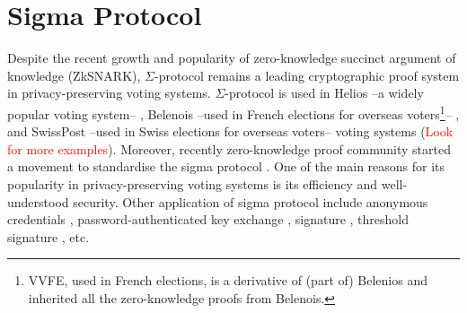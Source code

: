 \documentclass[conference,compsoc]{IEEEtran}
\begin{document}
\section{Sigma Protocol}\label{sigma_protocol}
Despite the recent growth and popularity of zero-knowledge succinct 
argument of knowledge (ZkSNARK), $\Sigma$-protocol remains a
leading cryptographic proof system in privacy-preserving voting systems. 
$\Sigma$-protocol is used in Helios --a widely popular voting system-- \cite{adida2008helios}, 
Belenois --used in French elections for overseas 
voters\footnote{VVFE, used in French elections, is a derivative of (part of) Belenios and 
inherited all the zero-knowledge proofs from Belenois.}-- \cite{cortier2023french}, and 
SwissPost --used in Swiss elections for overseas voters-- voting 
systems \cite{10.1007/978-3-031-15911-4_4} (\textcolor{red}{Look for more examples}). 
Moreover, recently zero-knowledge proof community started a movement to standardise
the sigma protocol \cite{ZKProof}.
One of the main reasons for its popularity in privacy-preserving voting systems is its
efficiency and well-understood security.  Other application of sigma protocol 
include anonymous credentials \cite{10.1145/2660267.2660328}, 
password-authenticated key exchange \cite{10.5555/2022815.2022838}, 
signature \cite{10.1007/0-387-34805-0_22}, threshold signature \cite{10.1007/978-3-030-81652-0_2}, 
etc. 
\end{document}
